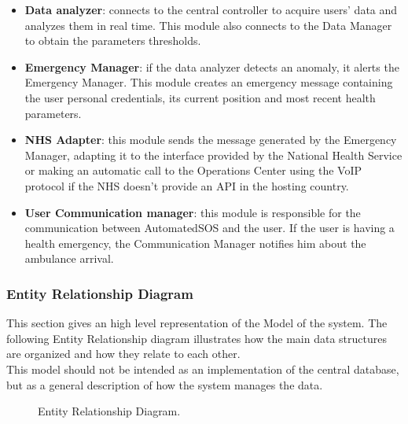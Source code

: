 \begin{itemize}
    \item \textbf{Data analyzer}: connects to the central controller to acquire users' data and analyzes them in real time. This module also connects to the Data Manager to obtain the parameters thresholds.
    \item \textbf{Emergency Manager}: if the data analyzer detects an anomaly, it alerts the Emergency Manager. This module creates an emergency message containing the user personal credentials, its current position and most recent health parameters.
    \item \textbf{NHS Adapter}: this module sends the message generated by the Emergency Manager, adapting it to the interface provided by the National Health Service or making an automatic call to the Operations Center using the VoIP protocol if the NHS doesn't provide an API in the hosting country.
    \item \textbf{User Communication manager}: this module is responsible for the communication between AutomatedSOS and the user. If the user is having a health emergency, the Communication Manager notifies him about the ambulance arrival.
\end{itemize}
\clearpage
\subsubsection{Entity Relationship Diagram}
This section gives an high level representation of the Model of the system.
The following Entity Relationship diagram illustrates how the main data structures are organized and how they relate to each other.\\
This model should not be intended as an implementation of the central database, but as a general description of how the system manages the data.\\
\vspace{60pt}
\begin{figure}[ht]
    \caption{Entity Relationship Diagram.}
\end{figure}
\clearpage
